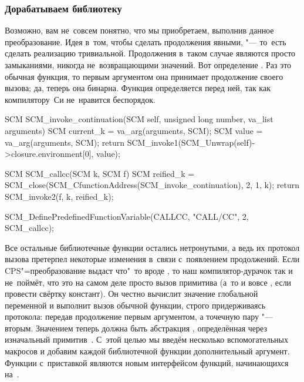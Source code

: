 \subsubsection{Дорабатываем библиотеку}\label{cc/call/cc/cc/ssect:runtime}

Возможно, вам не~совсем понятно, что мы приобретаем, выполнив данное
преобразование. Идея в~том, чтобы сделать продолжения явными, "--- то~есть
сделать реализацию  тривиальной. Продолжения в~таком случае являются
просто замыканиями, никогда не~возвращающими значений. Вот определение
. Раз это обычная функция, то первым аргументом она принимает
продолжение своего вызова; да, теперь она бинарна. Функция
 определяется перед ней, так как компилятору~Си
не~нравится беспорядок.

\begin{code:c}
SCM SCM_invoke_continuation(SCM self, unsigned long number,
                            va_list arguments)
{
    SCM current_k = va_arg(arguments, SCM);
    SCM value     = va_arg(arguments, SCM);
    return SCM_invoke1(SCM_Unwrap(self)->closure.environment[0], value);
}

SCM SCM_callcc(SCM k, SCM f)
{
    SCM reified_k =
        SCM_close(SCM_CfunctionAddress(SCM_invoke_continuation),
                  2, 1, k);
    return SCM_invoke2(f, k, reified_k);
}

SCM_DefinePredefinedFunctionVariable(CALLCC, "CALL/CC", 2, SCM_callcc);
\end{code:c}

Все остальные библиотечные функции остались нетронутыми, а ведь их протокол
вызова претерпел некоторые изменения в~связи с~появлением продолжений. Если
CPS"=преобразование выдаст что"~то вроде , то наш
компилятор-дурачок так и не~поймёт, что это на самом деле просто вызов примитива
 (а~то и вовсе , если провести свёртку констант).
Он честно вычислит значение глобальной переменной  и выполнит вызов
обычной функции, строго придерживаясь протокола: передав продолжение первым
аргументом, а точечную пару "--- вторым. Значением  теперь должна быть
абстракция , определённая через изначальный
примитив~. С~этой целью мы введём несколько вспомогательных макросов и
добавим каждой библиотечной функции дополнительный аргумент. Функции
с~приставкой  являются новым интерфейсом функций, начинающихся
на~.

